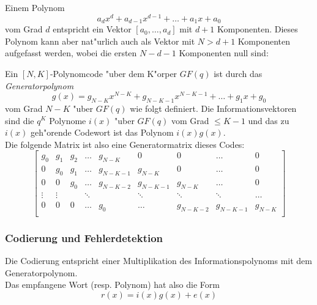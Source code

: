 \documentclass[german, 10pt, a4paper, twocolumn]{scrartcl}
\begin{document}
Einem Polynom
\begin{displaymath}
	a_d x^d + a_{d-1}x^{d-1}+\ldots + a_1 x+ a_0
\end{displaymath}
vom Grad $d$ entspricht ein Vektor $[a_0,\ldots,a_d]$ mit $d+1$ Komponenten. Dieses Polynom kann aber nat"urlich auch als Vektor mit $N>d+1$ Komponenten aufgefasst werden, wobei die ersten $N-d-1$ Komponenten null sind:
\begin{displaymath}
	[a_0,\ldots,a_d,0,\ldots,0]
\end{displaymath}


Ein $[N,K]$-Polynomcode "uber dem K"orper $GF(q)$ ist durch das \textit{Generatorpolynom}
\begin{displaymath}
	g(x) = g_{N-K}x^{N-K} + g_{N-K-1}x^{N-K-1}+\ldots+g_1x+g_0
\end{displaymath}
vom Grad $N-K$ "uber $GF(q)$ wie folgt definiert. Die Informationsvektoren sind die $q^K$ Polynome $i(x)$ "uber $GF(q)$ vom Grad $\leq K-1$ und das zu $i(x)$ geh"orende Codewort ist das Polynom $i(x)g(x)$.\\

Die folgende Matrix ist also eine Generatormatrix dieses Codes:
\tiny
\begin{displaymath}
	\left [
	\begin{array}{ccccccccc}
		g_0&	g_1&	g_2&	\ldots&	g_{N-K}&	0&	0&	\ldots&	0 \\
		0&	g_0&	g_1&	\ldots&	g_{N-K-1}&	g_{N-K}&	0&	\ldots&	0 \\
		0&	0&	g_0&	\ldots&	g_{N-K-2}&	g_{N-K-1}&	g_{N-K}&	\ldots&	0 \\
		\vdots&	\vdots&	&	\ddots&	&	\ddots&	\ddots&	\ddots&	\hdots\\
		0 &	0& 0& \ldots&	g_0 &	\ldots &	g_{N-K-2} &	g_{N-K-1}&	g_{N-K}\\
	\end{array}
	\right ]
\end{displaymath}
\normalsize


\subsubsection{Codierung und Fehlerdetektion}

Die Codierung entspricht einer Multiplikation des Informationspolynoms mit dem Generatorpolynom.\\

Das empfangene Wort (resp. Polynom) hat also die Form
\begin{displaymath}
	r(x) = i(x)g(x) + e(x)
\end{displaymath}
\end{document}
